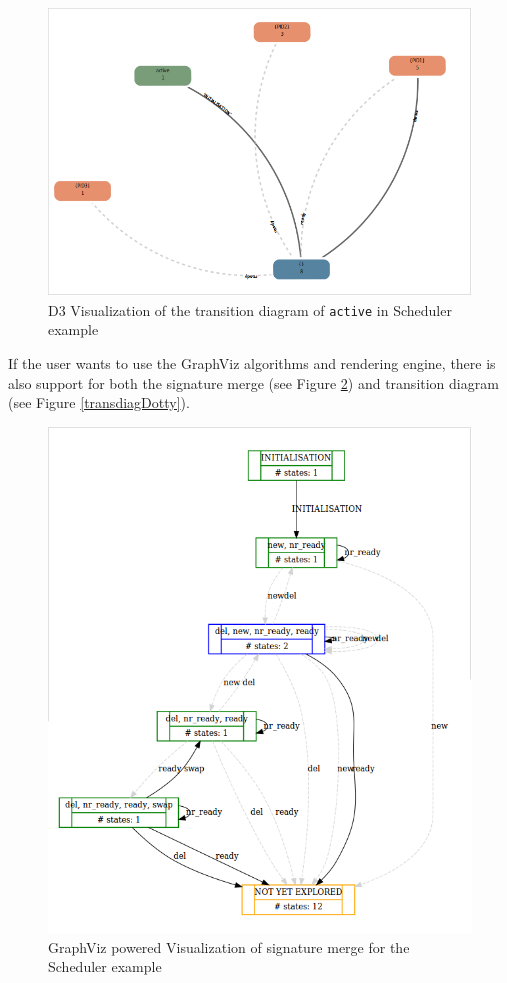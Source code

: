 \begin{center}
\begin{figure}[h!]
\includegraphics[width=14cm]{bilder/transdiag-wo.png}
\caption{D3 Visualization of the transition diagram of \texttt{active} in Scheduler example}
\label{transdiag}
\end{figure}
\end{center}

If the user wants to use the GraphViz algorithms and rendering engine, there is also support for both the signature merge (see Figure \ref{sigmergeDotty}) and transition diagram (see Figure \ref{transdiagDotty}).

\begin{center}
\begin{figure}[h!]
\includegraphics[width=14cm]{bilder/dotty-sigmerge.png}
\caption{GraphViz powered Visualization of signature merge for the Scheduler example}
\label{sigmergeDotty}
\end{figure}
\end{center}

